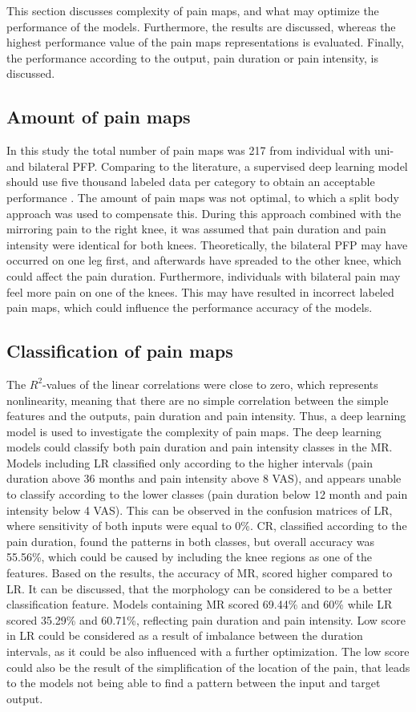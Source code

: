 This section discusses complexity of pain maps, and what may optimize the performance of the models. Furthermore, the results are discussed, whereas the highest performance value of the pain maps representations is evaluated. Finally, the performance according to the output, pain duration or pain intensity, is discussed.

\subsection*{Amount of pain maps}
In this study the total number of pain maps was 217 from individual with uni- and bilateral PFP. Comparing to the literature, a supervised deep learning model should use five thousand labeled data per category to obtain an acceptable performance \citep{Goodfellow2016}. 
The amount of pain maps was not optimal, to which a split body approach was used to compensate this. During this approach combined with the mirroring pain to the right knee, it was assumed that pain duration and pain intensity were identical for both knees. Theoretically, the bilateral PFP may have occurred on one leg first, and afterwards have spreaded to the other knee, which could affect the pain duration. Furthermore, individuals with bilateral pain may feel more pain on one of the knees. This may have resulted in incorrect labeled pain maps, which could influence the performance accuracy of the models.

\subsection*{Classification of pain maps}
The $R^2$-values of the linear correlations were close to zero, which represents nonlinearity, meaning that there are no simple correlation between the simple features and the outputs, pain duration and pain intensity. Thus, a deep learning model is used to investigate the complexity of pain maps.
The deep learning models could classify both pain duration and pain intensity classes in the MR. Models including LR classified only according to the higher intervals (pain duration above 36 months and pain intensity above 8 VAS), and appears unable to classify according to the lower classes (pain duration below 12 month and pain intensity below 4 VAS). This can be observed in the confusion matrices of LR, where sensitivity of both inputs were equal to 0\%. CR, classified according to the pain duration, found the patterns in both classes, but overall accuracy was 55.56\%, which could be caused by including the knee regions as one of the features.
Based on the results, the accuracy of MR, scored higher compared to LR. It can be discussed, that the morphology can be considered to be a better classification feature. Models containing MR scored 69.44\% and 60\% while LR scored 35.29\% and 60.71\%, reflecting pain duration and pain intensity.
Low score in LR could be considered as a result of imbalance between the duration intervals, as it could be also influenced with a further optimization. 
The low score could also be the result of the simplification of the location of the pain, that leads to the models not being able to find a pattern between the input and target output.  

